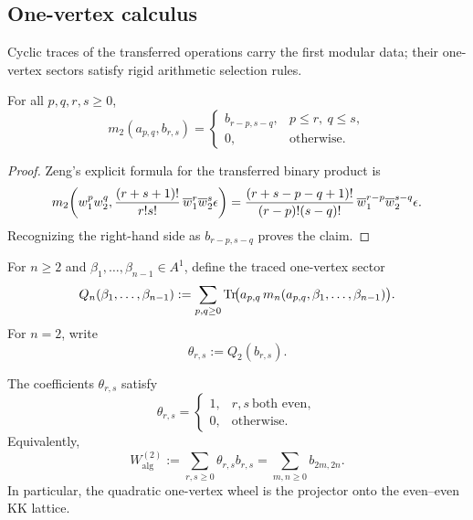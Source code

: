 \subsection{One-vertex calculus}
\label{subsec:concrete-one-vertex-calculus}

Cyclic traces of the transferred operations carry the first modular data; their one-vertex sectors satisfy rigid arithmetic selection rules.

\begin{proposition}
\label{prop:m2-shift-formula}
For all $p,q,r,s\ge 0$,
\[
m_2(a_{p,q},b_{r,s})=
\begin{cases}
 b_{r-p,s-q},& p\le r,\ q\le s,\\[4pt]
 0,& \text{otherwise.}
\end{cases}
\]
\end{proposition}

\begin{proof}
Zeng's explicit formula for the transferred binary product is
\[
m_2\!\left(w_1^p w_2^q,
\frac{(r+s+1)!}{r!s!}\,\overline{w}_1^r \overline{w}_2^s\epsilon\right)
=
\frac{(r+s-p-q+1)!}{(r-p)!(s-q)!}\,\overline{w}_1^{r-p}\overline{w}_2^{s-q}\epsilon.
\]
Recognizing the right-hand side as $b_{r-p,s-q}$ proves the claim.
\end{proof}

\begin{definition}
\label{def:one-vertex-traced-sectors}
For $n\ge 2$ and $\beta_1,\dots,\beta_{n-1}\in A^1$, define the traced one-vertex sector
\begin{equation}
\label{eq:one-vertex-traced-sector}
Q_n(\beta_1,\dots,\beta_{n-1})
:=
\sum_{p,q\ge 0}
\operatorname{Tr}\!\bigl(a_{p,q}\,m_n(a_{p,q},\beta_1,\dots,\beta_{n-1})\bigr).
\end{equation}
For $n=2$, write
\[
\theta_{r,s}:=Q_2(b_{r,s}).
\]
\end{definition}

\begin{theorem}
\label{thm:tadpole-projector}
The coefficients $\theta_{r,s}$ satisfy
\[
\theta_{r,s}=
\begin{cases}
1,& r,s\ \text{both even},\\
0,& \text{otherwise}.
\end{cases}
\]
Equivalently,
\[
W^{(2)}_{\mathrm{alg}}:=\sum_{r,s\ge 0}\theta_{r,s}b_{r,s}
=\sum_{m,n\ge 0} b_{2m,2n}.
\]
In particular, the quadratic one-vertex wheel is the projector onto the even--even KK lattice.
\end{theorem}

